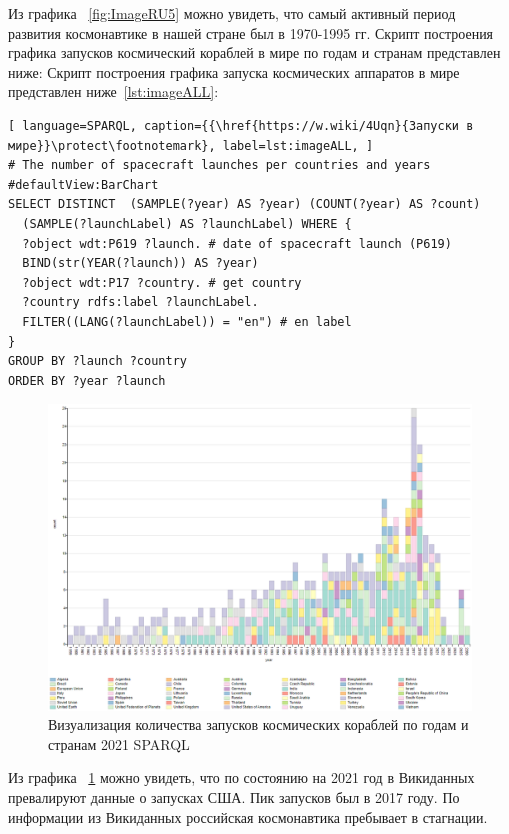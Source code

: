 Из графика ~\ref{fig:ImageRU5} можно увидеть, что самый активный период развития космонавтике в нашей стране был в 1970-1995 гг.
Скрипт построения графика запусков космический кораблей в мире по годам и странам представлен ниже: Скрипт построения графика запуска космических аппаратов в мире представлен ниже~\ref{lst:imageALL}:
\begin{lstlisting}[ language=SPARQL, caption={{\href{https://w.wiki/4Uqn}{Запуски в мире}}\protect\footnotemark}, label=lst:imageALL, ]
# The number of spacecraft launches per countries and years
#defaultView:BarChart
SELECT DISTINCT  (SAMPLE(?year) AS ?year) (COUNT(?year) AS ?count)
  (SAMPLE(?launchLabel) AS ?launchLabel) WHERE {
  ?object wdt:P619 ?launch. # date of spacecraft launch (P619)
  BIND(str(YEAR(?launch)) AS ?year)
  ?object wdt:P17 ?country. # get country
  ?country rdfs:label ?launchLabel.
  FILTER((LANG(?launchLabel)) = "en") # en label
}
GROUP BY ?launch ?country
ORDER BY ?year ?launch
\end{lstlisting}

\begin{figure}[h!]
  \includegraphics[width=\linewidth]{graphics/chapter/spacecraft_space_station/ImgALL.png}
  \caption[График мир]{Визуализация количества запусков космических кораблей по годам и странам 2021 SPARQL}%
  \label{fig:ImgALL}%
\end{figure}

Из графика ~\ref{fig:ImgALL} можно увидеть, что по состоянию на 2021 год в Викиданных превалируют данные о запусках США. Пик запусков был в 2017 году. По информации из Викиданных российская космонавтика пребывает в стагнации.
